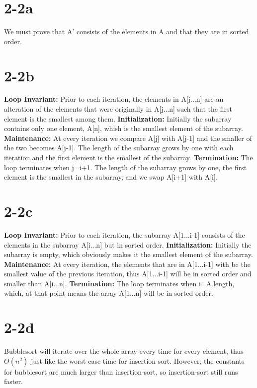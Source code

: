 \documentclass[12pt]{article}
\begin{document}
\section{2-2a}
We must prove that A' consists of the elements in A and that they are in sorted order.

\section{2-2b}
\textbf{Loop Invariant:} \newline
Prior to each iteration, the elements in A[j...n] are an alteration of the elements that were originally in A[j...n] such that the first element is the smallest among them. \newline \newline
\textbf{Initialization:} \newline
Initially the subarray contains only one element, A[n], whish is the smallest element of the subarray. \newline \newline
\textbf{Maintenance:} \newline
At every iteration we compare A[j] with A[j-1] and the smaller of the two becomes A[j-1]. The length of the subarray grows by one with each iteration and the first element is the smallest of the subarray. \newline \newline
\textbf{Termination:} \newline
The loop terminates when j=i+1. The length of the subarray grows by one, the first element is the smallest in the subarray, and we swap A[i+1] with A[i].

\section{2-2c}
\textbf{Loop Invariant:} \newline
Prior to each iteration, the subarray A[1...i-1] consists of the elements in the subarray A[i...n] but in sorted order. \newline \newline
\textbf{Initialization:} \newline
Initially the subarray is empty, which obviously makes it the smallest element of the subarray. \newline \newline
\textbf{Maintenance:} \newline
At every iteration, the elements that are in A[1...i-1] with be the smallest value of the previous iteration, thus A[1...i-1] will be in sorted order and smaller than A[i...n]. \newline \newline
\textbf{Termination:}
The loop terminates when i=A.length, which, at that point means the array A[1...n] will be in sorted order. 

\section{2-2d}
Bubblesort will iterate over the whole array every time for every element, thus $\Theta(n^2)$ just like the worst-case time for insertion-sort. However, the constants for bubblesort are much larger than insertion-sort, so insertion-sort still runs faster.
\end{document}
